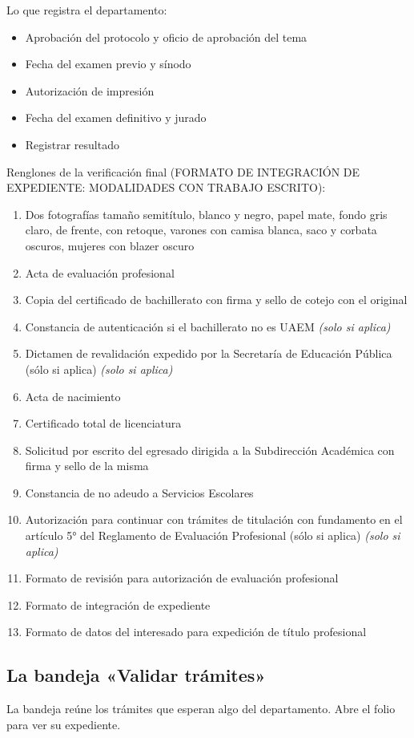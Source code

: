 Lo que registra el departamento:
\begin{itemize}
  \item Aprobación del protocolo y oficio de aprobación del tema
  \item Fecha del examen previo y sínodo
  \item Autorización de impresión
  \item Fecha del examen definitivo y jurado
  \item Registrar resultado
\end{itemize}
Renglones de la verificación final (FORMATO DE INTEGRACIÓN DE EXPEDIENTE: MODALIDADES CON TRABAJO ESCRITO):
\begin{enumerate}
  \item Dos fotografías tamaño semitítulo, blanco y negro, papel mate, fondo gris claro, de frente, con retoque, varones con camisa blanca, saco y corbata oscuros, mujeres con blazer oscuro
  \item Acta de evaluación profesional
  \item Copia del certificado de bachillerato con firma y sello de cotejo con el original
  \item Constancia de autenticación si el bachillerato no es UAEM \emph{(solo si aplica)}
  \item Dictamen de revalidación expedido por la Secretaría de Educación Pública (sólo si aplica) \emph{(solo si aplica)}
  \item Acta de nacimiento
  \item Certificado total de licenciatura
  \item Solicitud por escrito del egresado dirigida a la Subdirección Académica con firma y sello de la misma
  \item Constancia de no adeudo a Servicios Escolares
  \item Autorización para continuar con trámites de titulación con fundamento en el artículo 5° del Reglamento de Evaluación Profesional (sólo si aplica) \emph{(solo si aplica)}
  \item Formato de revisión para autorización de evaluación profesional
  \item Formato de integración de expediente
  \item Formato de datos del interesado para expedición de título profesional
\end{enumerate}
\subsection{La bandeja «Validar trámites»}
La bandeja reúne los trámites que esperan algo del departamento. Abre el folio para ver su expediente.
